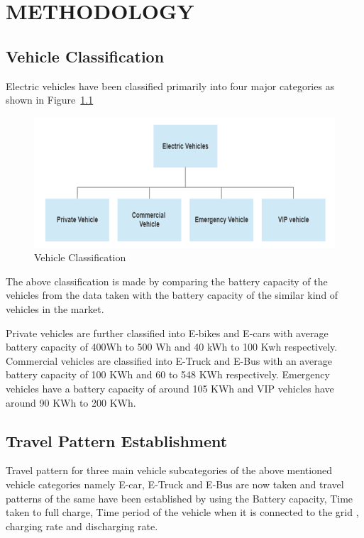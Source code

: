 	\chapter{METHODOLOGY}
	\label{chap:work}
	
	\section{Vehicle Classification}
	
	 Electric vehicles have been classified primarily into four major categories as shown in Figure~\ref{fig:classification} 
	 	
			\begin{figure}[h]
				\centering
				\includegraphics[width=0.7\linewidth]{classification}
				\caption{Vehicle Classification}
				\label{fig:classification}
			\end{figure}
		
	The above classification is made by comparing the battery capacity of the vehicles from the data \cite{evdata} taken with the battery capacity of the similar kind of vehicles in the market.

	\par {Private vehicles are further classified into E-bikes and E-cars with average battery capacity of 400Wh to 500 Wh and 40 kWh to 100 Kwh respectively. Commercial vehicles are classified into E-Truck and E-Bus with an average battery capacity of 100 KWh and 60 to 548 KWh respectively. Emergency vehicles have a battery capacity of around 105 KWh and VIP vehicles have around 90 KWh to 200 KWh.
	}
	
	\section{Travel Pattern Establishment}
	
	Travel pattern for three main vehicle subcategories of the above mentioned vehicle categories namely E-car, E-Truck and E-Bus are now taken and travel patterns of the same have been established by using the Battery capacity, Time taken to full charge, Time period of the vehicle when it is connected to the grid , charging rate and discharging rate\cite{evdata}.
	
